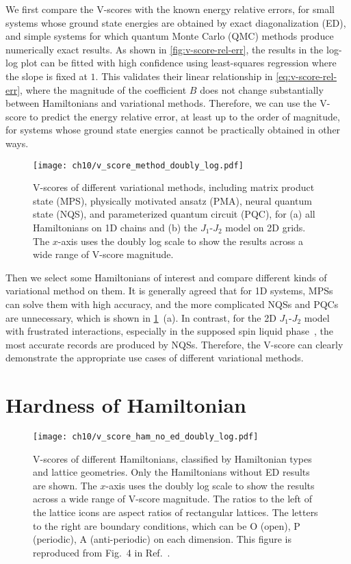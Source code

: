 We first compare the V-scores with the known energy relative errors, for small systems whose ground state energies are obtained by exact diagonalization (ED), and simple systems for which quantum Monte Carlo (QMC) methods produce numerically exact results. As shown in \cref{fig:v-score-rel-err}, the results in the log-log plot can be fitted with high confidence using least-squares regression where the slope is fixed at $1$. This validates their linear relationship in \cref{eq:v-score-rel-err}, where the magnitude of the coefficient $B$ does not change substantially between Hamiltonians and variational methods. Therefore, we can use the V-score to predict the energy relative error, at least up to the order of magnitude, for systems whose ground state energies cannot be practically obtained in other ways.

\begin{figure}[htb]
\centering
\texttt{[image: ch10/v\_score\_method\_doubly\_log.pdf]}
\caption[V-scores of different variational methods]{
V-scores of different variational methods, including matrix product state (MPS), physically motivated ansatz (PMA), neural quantum state (NQS), and parameterized quantum circuit (PQC), for (a) all Hamiltonians on 1D chains and (b) the $J_1$-$J_2$ model on 2D grids.
The $x$-axis uses the doubly log scale to show the results across a wide range of V-score magnitude.
}
\label{fig:v-score-method}
\end{figure}

Then we select some Hamiltonians of interest and compare different kinds of variational method on them. It is generally agreed that for 1D systems, MPSs can solve them with high accuracy, and the more complicated NQSs and PQCs are unnecessary, which is shown in \cref{fig:v-score-method}~(a). In contrast, for the 2D $J_1$-$J_2$ model with frustrated interactions, especially in the supposed spin liquid phase~\cite{dagotto1989phase, schulz1996magnetic, hu2013direct, liang2018solving, liu2018gapless, choo2019two, nomura2021dirac}, the most accurate records are produced by NQSs. Therefore, the V-score can clearly demonstrate the appropriate use cases of different variational methods.

\section{Hardness of Hamiltonian}

\begin{figure}[htb]
\centering
\texttt{[image: ch10/v\_score\_ham\_no\_ed\_doubly\_log.pdf]}
\caption[V-scores of different Hamiltonians]{
V-scores of different Hamiltonians, classified by Hamiltonian types and lattice geometries.
Only the Hamiltonians without ED results are shown.
The $x$-axis uses the doubly log scale to show the results across a wide range of V-score magnitude.
The ratios to the left of the lattice icons are aspect ratios of rectangular lattices. The letters to the right are boundary conditions, which can be O (open), P (periodic), A (anti-periodic) on each dimension.
This figure is reproduced from Fig.~4 in Ref.~\cite{wu2024variational}.
}
\label{fig:v-score-ham}
\end{figure}

